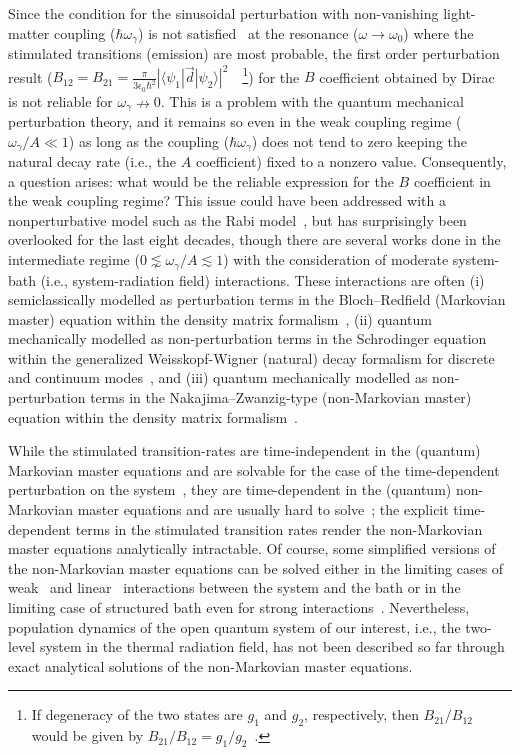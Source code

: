 \documentclass[aps,pra,twocolumn,showpacs,preprintnumbers,amsmath,amssymb,footinbib]{revtex4}
\begin{document}
Since the condition for the sinusoidal perturbation with non-vanishing light-matter coupling ($\hbar\omega_\gamma$) is not satisfied~\cite{Griffiths} at the resonance ($\omega\rightarrow\omega_0$) where the stimulated transitions (emission) are most probable, the first order perturbation result ($B_{12}=B_{21}=\frac{\pi}{3\epsilon_0\hbar^2}|\langle\psi_1|\vec{d}|\psi_2\rangle|^2$~\cite{Dirac,Griffiths}~\footnote{If degeneracy of the two states are $g_1$ and $g_2$, respectively, then $B_{21}/B_{12}$ would be given by $B_{21}/B_{12}=g_1/g_2$~\cite{Hilborn}.}) for the $B$ coefficient obtained by Dirac~\cite{Dirac} is not reliable for $\omega_\gamma\nrightarrow0$. This is a problem with the quantum mechanical perturbation theory, and it remains so even in the weak coupling regime ($\omega_\gamma/A\ll1$) as long as the coupling ($\hbar\omega_\gamma$) does not tend to zero keeping the natural decay rate (i.e., the $A$ coefficient) fixed to a nonzero value. Consequently, a question arises: what would be the reliable expression for the $B$ coefficient in the weak coupling regime? This issue could have been addressed with a nonperturbative model such as the Rabi model~\cite{Rabi,Rabi2}, but has surprisingly been overlooked for the last eight decades, though there are several works done in the intermediate regime ($0\lnsim\omega_\gamma/A\lesssim1$) with the consideration of moderate system-bath (i.e., system-radiation field) interactions. These interactions are often (i) semiclassically modelled as perturbation terms in the Bloch--Redfield (Markovian master) equation within the density matrix formalism~\cite{Wollfarth,Leggett}, (ii) quantum mechanically modelled as non-perturbation terms in the Schrodinger equation within the generalized Weisskopf-Wigner (natural) decay formalism for discrete and continuum modes~\cite{Cohen-Tannudji2}, and (iii) quantum mechanically modelled as non-perturbation terms in the Nakajima--Zwanzig-type (non-Markovian master) equation within the density matrix formalism~\cite{Nakajima,Anastopoulos}.

While the stimulated transition-rates are time-independent in the (quantum) Markovian master equations and are solvable for the case of the time-dependent perturbation on the system~\cite{Lindblad,Leggett,Wollfarth}, they are time-dependent in the (quantum) non-Markovian master equations and are usually hard to solve~\cite{Nakajima,Anastopoulos}; the explicit time-dependent terms in the stimulated transition rates render the non-Markovian master equations analytically intractable. Of course, some simplified versions of the non-Markovian master equations can be solved either in the limiting cases of weak~\cite{Intravaia} and linear~\cite{Chakraborty} interactions between the system and the bath or in the limiting case of structured bath even for strong interactions~\cite{Escher}.  Nevertheless, population dynamics of the open quantum system of our interest, i.e., the two-level system in the thermal radiation field, has not been described so far through exact analytical solutions of the non-Markovian master equations.
\end{document}
